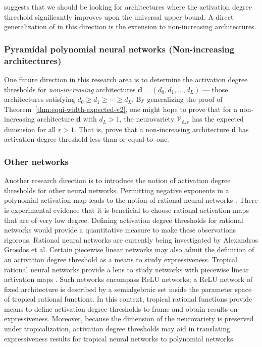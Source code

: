 \documentclass[12pt]{article}
\theoremstyle{definition}
\newcommand{\demph}[1]{\emph{{\color{RoyalBlue}#1}}}
\begin{document}
 suggests that we should be looking for architectures where the activation degree threshold significantly improves upon the universal upper bound. A direct generalization of  in this direction is the extension to non-increasing architectures.

\subsubsection*{Pyramidal polynomial neural networks (Non-increasing architectures)}
One future direction in this research area is to determine the activation degree thresholds for  \demph{non-increasing} architectures $\mathbf{d} = (d_0,d_1,\dotsc,d_L)$ --- those architectures satisfying $d_0\ge d_1\ge\dotsb\ge d_L$. 
By generalizing the proof of Theorem~\ref{thm:equi-width-expected-v2}, one might hope to prove  \cite[Conjecture 5.7]{KLW2024} that for a non-increasing architecture $\mathbf{d}$ with $d_L>1$, the neurovariety $\mathcal{V}_{\mathbf{d},r}$ has the expected dimension for all $r>1$. That is, prove that a non-increasing architecture $\mathbf{d}$ has activation degree threshold less than or equal to~one. 


\subsubsection*{Other networks}
Another research direction is to introduce the notion of activation degree thresholds for other neural networks. Permitting negative exponents in a polynomial activation map leads to the notion of rational neural networks \cite{boulle2020rational}. There is experimental evidence that it is beneficial to choose rational activation maps that are of very low degree. Defining activation degree thresholds for rational networks would provide a quantitative measure to make these observations rigorous. Rational neural networks are currently being investigated by Alexandros Grosdos et al. Certain piecewise linear networks may also admit the definition of an activation degree threshold as a means to study expressiveness. Tropical rational neural networks provide a lens to study networks with piecewise linear activation maps \cite{alfarra2022decision,Charisopoulos,charisopoulos2018tropical,zhang18}. Such networks encompass ReLU networks; a ReLU network of fixed architecture is described by a semialgebraic set inside the parameter space of tropical rational functions. In this context, tropical rational functions provide means to define activation degree thresholds to frame and obtain results on expressiveness. Moreover, because the dimension of the neurovariety is preserved under tropicalization, activation degree thresholds may aid in translating expressiveness results for tropical neural networks to polynomial networks. 
\end{document}
